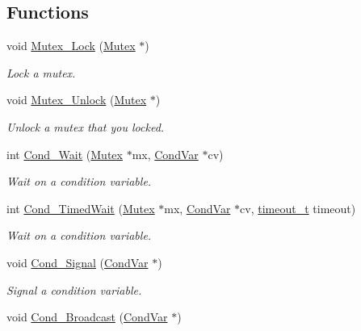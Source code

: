 \subsection*{Functions}
\begin{DoxyCompactItemize}
\item 
void \hyperlink{group__syscalls_ga1140be44df71d39edaf6a7262fb763ca}{Mutex\+\_\+\+Lock} (\hyperlink{group__syscalls_gaef2ec62cae8e0031fd19fc8b91083ade}{Mutex} $\ast$)
\begin{DoxyCompactList}\small\item\em Lock a mutex. \end{DoxyCompactList}\item 
void \hyperlink{group__syscalls_ga0b98d0315d0931d0c28104c36dd559c9}{Mutex\+\_\+\+Unlock} (\hyperlink{group__syscalls_gaef2ec62cae8e0031fd19fc8b91083ade}{Mutex} $\ast$)
\begin{DoxyCompactList}\small\item\em Unlock a mutex that you locked. \end{DoxyCompactList}\item 
int \hyperlink{group__syscalls_ga970dca2210b3f2ec8aedab7f542a9bf4}{Cond\+\_\+\+Wait} (\hyperlink{group__syscalls_gaef2ec62cae8e0031fd19fc8b91083ade}{Mutex} $\ast$mx, \hyperlink{structCondVar}{Cond\+Var} $\ast$cv)
\begin{DoxyCompactList}\small\item\em Wait on a condition variable. \end{DoxyCompactList}\item 
int \hyperlink{group__syscalls_ga4e955b769339be9ea6a0c1bd4151c48f}{Cond\+\_\+\+Timed\+Wait} (\hyperlink{group__syscalls_gaef2ec62cae8e0031fd19fc8b91083ade}{Mutex} $\ast$mx, \hyperlink{structCondVar}{Cond\+Var} $\ast$cv, \hyperlink{group__syscalls_gaf412159e5cef839836a5e7b19ee75d1c}{timeout\+\_\+t} timeout)
\begin{DoxyCompactList}\small\item\em Wait on a condition variable. \end{DoxyCompactList}\item 
void \hyperlink{group__syscalls_ga43f64f8be273d2fe77d7de5f4b81e22d}{Cond\+\_\+\+Signal} (\hyperlink{structCondVar}{Cond\+Var} $\ast$)
\begin{DoxyCompactList}\small\item\em Signal a condition variable. \end{DoxyCompactList}\item 
void \hyperlink{group__syscalls_ga8196aa2a48cad90742f254cc3b8fd351}{Cond\+\_\+\+Broadcast} (\hyperlink{structCondVar}{Cond\+Var} $\ast$)

\end{DoxyCompactItemize}
